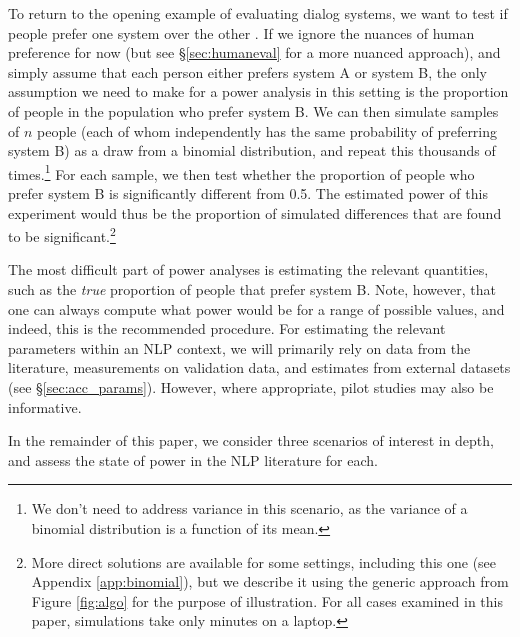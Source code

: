 \documentclass[11pt,a4paper]{article}
\begin{document}
To return to the opening example of evaluating dialog systems,  we want to test if people prefer one system over the other \citep{ai.2007}. If we ignore the nuances of human preference for now (but see \S\ref{sec:humaneval} for a more nuanced approach), and simply assume that each person either prefers system A or system B, the only assumption we need to make for a power analysis in this setting is the proportion of people in the population who prefer system B. We can then simulate samples of $n$ people (each of whom independently has the same probability of preferring system B) as a draw from a binomial distribution, and repeat this thousands of times.\footnote{We don't need to address variance
in this scenario, as the variance of a binomial distribution is a function of its mean.} For each sample, we then test whether the proportion of people who prefer system B is significantly different from 0.5. The estimated power of this experiment would thus be the proportion of simulated differences that are found to be significant.\footnote{More direct solutions are available for some settings, including this one (see Appendix \ref{app:binomial}), but we describe it using the generic approach from Figure \ref{fig:algo} for the purpose of illustration. For all cases examined in this paper, simulations take only minutes on a laptop.}


The most difficult part of power analyses is estimating the relevant quantities, such as the \emph{true} proportion of people that prefer system B. Note, however, that one can always compute what power would be for a range of possible values, and indeed, this is the recommended procedure.
For estimating the relevant parameters within an NLP context, we will primarily rely on data from the literature, measurements on validation data, and estimates from external datasets (see \S\ref{sec:acc_params}).
However, where appropriate, 
pilot studies may also be informative.

In the remainder of this paper, we 
consider
three scenarios of interest
in depth, 
and assess the state of power in the NLP literature for each.
\end{document}
